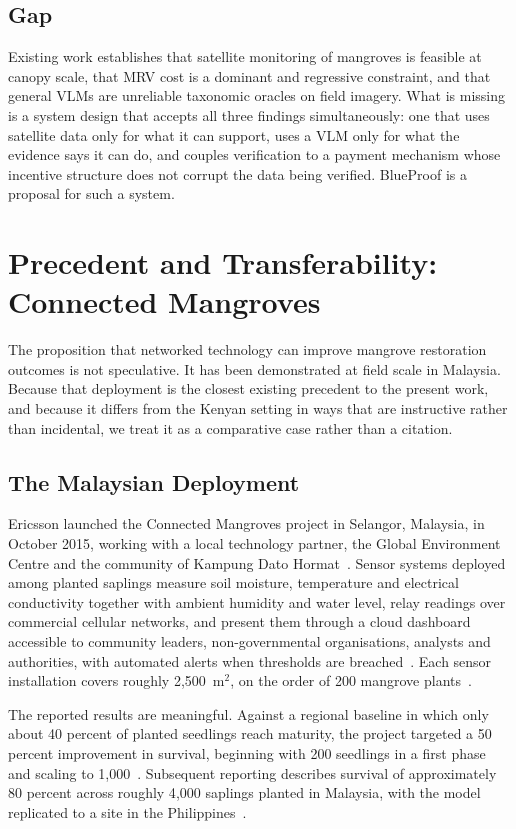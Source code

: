 \documentclass[10pt,twocolumn,a4paper]{article}
\begin{document}
\subsection{Gap}

Existing work establishes that satellite monitoring of mangroves is feasible at
canopy scale, that MRV cost is a dominant and regressive constraint, and that
general VLMs are unreliable taxonomic oracles on field imagery. What is missing
is a system design that accepts all three findings simultaneously: one that uses
satellite data only for what it can support, uses a VLM only for what the
evidence says it can do, and couples verification to a payment mechanism whose
incentive structure does not corrupt the data being verified. BlueProof is a
proposal for such a system.

\section{Precedent and Transferability: Connected Mangroves}
\label{sec:malaysia}

The proposition that networked technology can improve mangrove restoration
outcomes is not speculative. It has been demonstrated at field scale in
Malaysia. Because that deployment is the closest existing precedent to the
present work, and because it differs from the Kenyan setting in ways that are
instructive rather than incidental, we treat it as a comparative case rather
than a citation.

\subsection{The Malaysian Deployment}

Ericsson launched the Connected Mangroves project in Selangor, Malaysia, in
October 2015, working with a local technology partner, the Global Environment
Centre and the community of Kampung Dato Hormat~\cite{unfccc2015,ericsson2019}.
Sensor systems deployed among planted saplings measure soil moisture,
temperature and electrical conductivity together with ambient humidity and water
level, relay readings over commercial cellular networks, and present them
through a cloud dashboard accessible to community leaders, non-governmental
organisations, analysts and authorities, with automated alerts when thresholds
are breached~\cite{unfccc2015}. Each sensor installation covers roughly
2{,}500~m$^2$, on the order of 200 mangrove plants~\cite{unfccc2015}.

The reported results are meaningful. Against a regional baseline in which only
about 40 percent of planted seedlings reach maturity, the project targeted a 50
percent improvement in survival, beginning with 200 seedlings in a first phase
and scaling to 1{,}000~\cite{unfccc2015}. Subsequent reporting describes
survival of approximately 80 percent across roughly 4{,}000 saplings planted in
Malaysia, with the model replicated to a site in the
Philippines~\cite{ericsson2019}.
\end{document}

